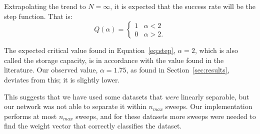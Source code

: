 Extrapolating the trend to \(N=\infty\), it is expected that the success rate will be the step function.
That is:
\begin{equation} \label{eq:step}
	Q(\alpha) =
	\begin{cases}
	    1 & \alpha < 2\\
	    0 & \alpha > 2\text{.}
	\end{cases}
\end{equation}

 The expected critical value found in Equation~\ref{eq:step}, \(\alpha=2\), which is also called the storage capacity, is in accordance with the value found in the literature\cite{perceptron_slides2}.
 Our observed value, \(\alpha = 1.75\), as found in Section~\ref{sec:results}, deviates from this; it is slightly lower.
 
 This suggests that we have used some datasets that \emph{were} linearly separable, but our network was not able to separate it within \(n_{max}\) sweeps.
 Our implementation performs at most \(n_{max}\) sweeps, and for these datasets more sweeps were needed to find the weight vector that correctly classifies the dataset.
